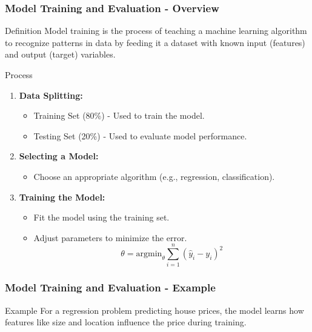 \documentclass[aspectratio=169]{beamer}
\begin{document}
\begin{frame}[fragile]
    \frametitle{Model Training and Evaluation - Overview}
    \begin{block}{Definition}
        Model training is the process of teaching a machine learning algorithm to recognize patterns in data by feeding it a dataset with known input (features) and output (target) variables.
    \end{block}

    \begin{block}{Process}
        \begin{enumerate}
            \item \textbf{Data Splitting:}
            \begin{itemize}
                \item Training Set (80\%) - Used to train the model.
                \item Testing Set (20\%) - Used to evaluate model performance.
            \end{itemize}
            \item \textbf{Selecting a Model:}
            \begin{itemize}
                \item Choose an appropriate algorithm (e.g., regression, classification).
            \end{itemize}
            \item \textbf{Training the Model:}
            \begin{itemize}
                \item Fit the model using the training set.
                \item Adjust parameters to minimize the error.
                \begin{equation}
                \theta = \text{argmin}_{\theta} \sum_{i=1}^{n} (\hat{y}_i - y_i)^2
                \end{equation}
            \end{itemize}
        \end{enumerate}
    \end{block}
\end{frame}

\begin{frame}[fragile]
    \frametitle{Model Training and Evaluation - Example}
    \begin{block}{Example}
        For a regression problem predicting house prices, the model learns how features like size and location influence the price during training.
    \end{block}
\end{frame}
\end{document}

